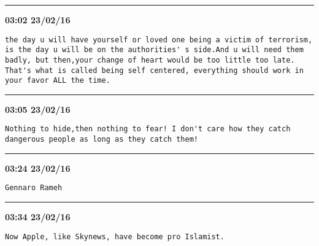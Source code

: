 \hrule%

\begin{adjustwidth}{0cm}{0cm}
\footnotesize \textbf{03:02 23/02/16}

\begin{lstlisting}[breaklines, breakatwhitespace, basicstyle=\small, frame=leftline]
the day u will have yourself or loved one being a victim of terrorism, is the day u will be on the authorities' s side.And u will need them badly, but then,your change of heart would be too little too late. That's what is called being self centered, everything should work in your favor ALL the time.
\end{lstlisting}
\end{adjustwidth}

\hrule%

\begin{adjustwidth}{0cm}{0cm}
\footnotesize \textbf{03:05 23/02/16}

\begin{lstlisting}[breaklines, breakatwhitespace, basicstyle=\small, frame=leftline]
Nothing to hide,then nothing to fear! I don't care how they catch dangerous people as long as they catch them!
\end{lstlisting}
\end{adjustwidth}

\hrule%

\begin{adjustwidth}{0cm}{0cm}
\footnotesize \textbf{03:24 23/02/16}

\begin{lstlisting}[breaklines, breakatwhitespace, basicstyle=\small, frame=leftline]
Gennaro Rameh
\end{lstlisting}
\end{adjustwidth}

\hrule%

\begin{adjustwidth}{0cm}{0cm}
\footnotesize \textbf{03:34 23/02/16}

\begin{lstlisting}[breaklines, breakatwhitespace, basicstyle=\small, frame=leftline]
Now Apple, like Skynews, have become pro Islamist.
\end{lstlisting}
\end{adjustwidth}

